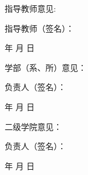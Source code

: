 \begin{sectionCell}
  指导教师意见:
    \vspace{4cm}
    \begin{flushright}
      指导教师（签名）：
      \coverunderline[3cm]{}
      \qquad \qquad
  
      年 \quad 月 \quad 日
    \end{flushright}
    \vspace{2cm}
\end{sectionCell}
\begin{sectionCell}
  学部（系、所）意见：
    \vspace{2cm}
    \begin{flushright}
      负责人（签名）：
      \coverunderline[3cm]{}
      \qquad \qquad
  
      年 \quad 月 \quad 日
    \end{flushright}
    \vspace{2cm}
\end{sectionCell}
\begin{sectionCell}
  二级学院意见：
    \vspace{2cm}
    \begin{flushright}
      负责人（签名）：
      \coverunderline[3cm]{}
      \qquad \qquad
  
      年 \quad 月 \quad 日
    \end{flushright}
    \vspace{2cm}
\end{sectionCell}
\begin{tablenotes}
  \item {}
\end{tablenotes}

